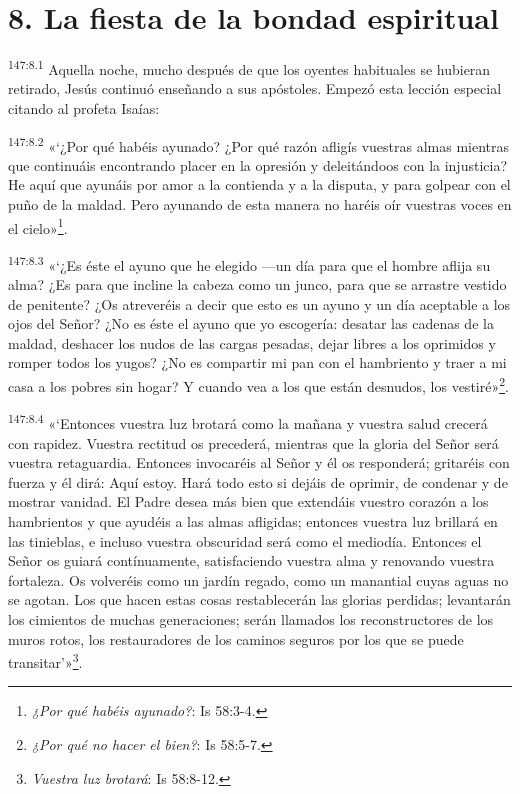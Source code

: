 \section*{8. La fiesta de la bondad espiritual}
\par 
\textsuperscript{147:8.1} Aquella noche, mucho después de que los oyentes habituales se hubieran retirado, Jesús continuó enseñando a sus apóstoles. Empezó esta lección especial citando al profeta Isaías:

\par 
\textsuperscript{147:8.2} «`¿Por qué habéis ayunado? ¿Por qué razón afligís vuestras almas mientras que continuáis encontrando placer en la opresión y deleitándoos con la injusticia? He aquí que ayunáis por amor a la contienda y a la disputa, y para golpear con el puño de la maldad. Pero ayunando de esta manera no haréis oír vuestras voces en el cielo»\footnote{\textit{¿Por qué habéis ayunado?}: Is 58:3-4.}.

\par 
\textsuperscript{147:8.3} «`¿Es éste el ayuno que he elegido ---un día para que el hombre aflija su alma? ¿Es para que incline la cabeza como un junco, para que se arrastre vestido de penitente? ¿Os atreveréis a decir que esto es un ayuno y un día aceptable a los ojos del Señor? ¿No es éste el ayuno que yo escogería: desatar las cadenas de la maldad, deshacer los nudos de las cargas pesadas, dejar libres a los oprimidos y romper todos los yugos? ¿No es compartir mi pan con el hambriento y traer a mi casa a los pobres sin hogar? Y cuando vea a los que están desnudos, los vestiré»\footnote{\textit{¿Por qué no hacer el bien?}: Is 58:5-7.}.

\par 
\textsuperscript{147:8.4} «`Entonces vuestra luz brotará como la mañana y vuestra salud crecerá con rapidez. Vuestra rectitud os precederá, mientras que la gloria del Señor será vuestra retaguardia. Entonces invocaréis al Señor y él os responderá; gritaréis con fuerza y él dirá: Aquí estoy. Hará todo esto si dejáis de oprimir, de condenar y de mostrar vanidad. El Padre desea más bien que extendáis vuestro corazón a los hambrientos y que ayudéis a las almas afligidas; entonces vuestra luz brillará en las tinieblas, e incluso vuestra obscuridad será como el mediodía. Entonces el Señor os guiará contínuamente, satisfaciendo vuestra alma y renovando vuestra fortaleza. Os volveréis como un jardín regado, como un manantial cuyas aguas no se agotan. Los que hacen estas cosas restablecerán las glorias perdidas; levantarán los cimientos de muchas generaciones; serán llamados los reconstructores de los muros rotos, los restauradores de los caminos seguros por los que se puede transitar'»\footnote{\textit{Vuestra luz brotará}: Is 58:8-12.}.

